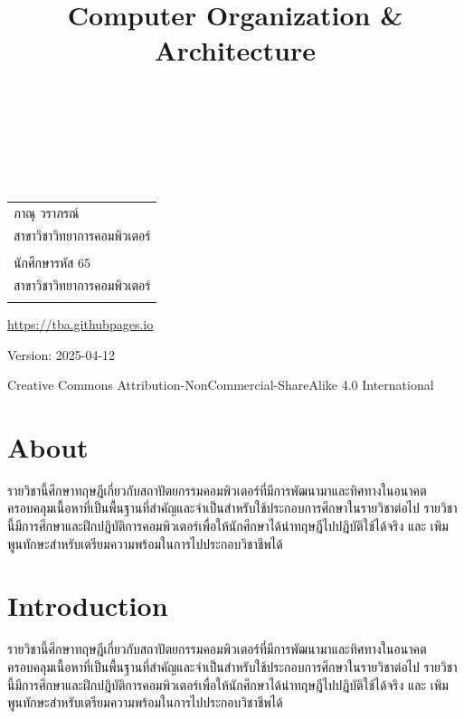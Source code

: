 \documentclass[
  notoc %
]{tufte-book}
\title{Computer Organization \& Architecture}
\author{\noindent{ภาณุ วราภรณ์}\\[3mm] \noindent{นักศึกษารหัส 65}\\[3mm] }
\date{}
\begin{document}
\makeatletter
\thispagestyle{empty}
\vfill
{\Huge\bf
\noindent
\@title
}\\[1in]
{\Large
\noindent
\@author
}
\makeatother

\makeatletter
\newpage
\thispagestyle{empty}
\vfill
{\noindent
\begin{tabular}{l} ภาณุ วราภรณ์\\ สาขาวิชาวิทยาการคอมพิวเตอร์\\ \\ นักศึกษารหัส 65\\ สาขาวิชาวิทยาการคอมพิวเตอร์\\ \\ \end{tabular}
}
\vfill
{\small
\url{https://tba.githubpages.io}

Version: 2025-04-12

Creative Commons Attribution-NonCommercial-ShareAlike 4.0 International
}
\makeatother


\frontmatter
\mainmatter
{}

\setcounter{tocdepth}{1}
\tableofcontents

\justifying

\setlength{\parindent}{0pt}

\hypertarget{about}{%
\chapter*{About}\label{about}}

รายวิชานี้ศึกษาทฤษฎีเกี่ยวกับสถาปัตยกรรมคอมพิวเตอร์ที่มีการพัฒนามาและทิศทางในอนาคต
ครอบคลุมเนื้อหาที่เป็นพื้นฐานที่สำคัญและจำเป็นสำหรับใช้ประกอบการศึกษาในรายวิชาต่อไป
รายวิชานี้มีการศึกษาและฝึกปฎิบัติการคอมพิวเตอร์เพื่อให้นักศึกษาได้นำทฤษฎีไปปฎิบัติใช้ได้จริง และ
เพิมพูนทักษะสำหรับเตรียมความพร้อมในการไปประกอบวิชาชีพได้

\hypertarget{sec:intro}{%
\chapter{Introduction}\label{sec:intro}}

รายวิชานี้ศึกษาทฤษฎีเกี่ยวกับสถาปัตยกรรมคอมพิวเตอร์ที่มีการพัฒนามาและทิศทางในอนาคต
ครอบคลุมเนื้อหาที่เป็นพื้นฐานที่สำคัญและจำเป็นสำหรับใช้ประกอบการศึกษาในรายวิชาต่อไป
รายวิชานี้มีการศึกษาและฝึกปฎิบัติการคอมพิวเตอร์เพื่อให้นักศึกษาได้นำทฤษฎีไปปฎิบัติใช้ได้จริง และ
เพิมพูนทักษะสำหรับเตรียมความพร้อมในการไปประกอบวิชาชีพได้
\end{document}
